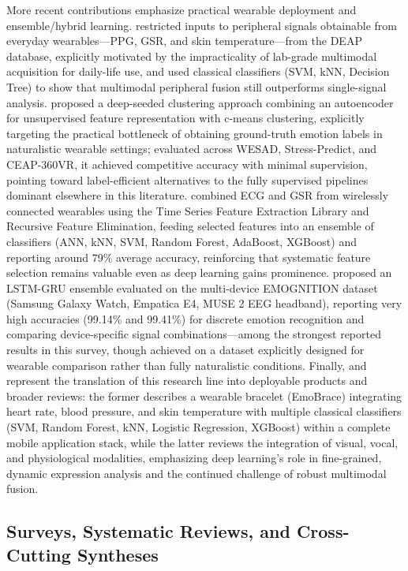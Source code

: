 More recent contributions emphasize practical wearable deployment and ensemble/hybrid learning. \cite{gohumpu2023emotion} restricted inputs to peripheral signals obtainable from everyday wearables---PPG, GSR, and skin temperature---from the DEAP database, explicitly motivated by the impracticality of lab-grade multimodal acquisition for daily-life use, and used classical classifiers (SVM, kNN, Decision Tree) to show that multimodal peripheral fusion still outperforms single-signal analysis. \cite{a2023deep} proposed a deep-seeded clustering approach combining an autoencoder for unsupervised feature representation with c-means clustering, explicitly targeting the practical bottleneck of obtaining ground-truth emotion labels in naturalistic wearable settings; evaluated across WESAD, Stress-Predict, and CEAP-360VR, it achieved competitive accuracy with minimal supervision, pointing toward label-efficient alternatives to the fully supervised pipelines dominant elsewhere in this literature. \cite{subasi2025multimodal} combined ECG and GSR from wirelessly connected wearables using the Time Series Feature Extraction Library and Recursive Feature Elimination, feeding selected features into an ensemble of classifiers (ANN, kNN, SVM, Random Forest, AdaBoost, XGBoost) and reporting around 79\% average accuracy, reinforcing that systematic feature selection remains valuable even as deep learning gains prominence. \cite{nandini2025ensemble} proposed an LSTM-GRU ensemble evaluated on the multi-device EMOGNITION dataset (Samsung Galaxy Watch, Empatica E4, MUSE 2 EEG headband), reporting very high accuracies (99.14\% and 99.41\%) for discrete emotion recognition and comparing device-specific signal combinations---among the strongest reported results in this survey, though achieved on a dataset explicitly designed for wearable comparison rather than fully naturalistic conditions. Finally, \cite{sharef2026development} and \cite{udahemuka2024multimodal} represent the translation of this research line into deployable products and broader reviews: the former describes a wearable bracelet (EmoBrace) integrating heart rate, blood pressure, and skin temperature with multiple classical classifiers (SVM, Random Forest, kNN, Logistic Regression, XGBoost) within a complete mobile application stack, while the latter reviews the integration of visual, vocal, and physiological modalities, emphasizing deep learning's role in fine-grained, dynamic expression analysis and the continued challenge of robust multimodal fusion.

\subsection{Surveys, Systematic Reviews, and Cross-Cutting Syntheses}

